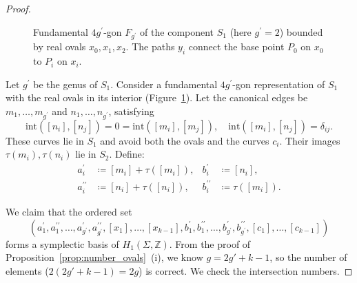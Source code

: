\documentclass[11pt,a4paper]{article}
\theoremstyle{definition}
\newcommand{\Z}{\mathds{Z}}
\begin{document}
\begin{proof}
\begin{figure}[htbp]
	\caption{Fundamental $4g^{\prime}$-gon $F_{g^{\prime}}$ of the component $S_1$ (here $g^{\prime}=2$) bounded by real ovals $x_0, x_1, x_2$. The paths $y_i$ connect the base point $P_0$ on $x_0$ to $P_i$ on $x_i$.}
	\label{fig:fundamental}
\end{figure}
	
	Let $g^{\prime}$ be the genus of $S_1$. Consider a fundamental $4g^{\prime}$-gon representation of $S_1$ with the real ovals in its interior (Figure~\ref{fig:fundamental}). Let the canonical edges be $m_1, \dots, m_{g^{\prime}}$ and $n_1, \dots, n_{g^{\prime}}$, satisfying
	\[
	\mathrm{int}([n_i], [n_j]) = 0 = \mathrm{int}([m_i], [m_j]), \quad
	\mathrm{int}([m_i], [n_j]) = \delta_{ij}.
	\]
	These curves lie in $S_1$ and avoid both the ovals and the curves $c_i$. Their images $\tau(m_i), \tau(n_i)$ lie in $S_2$. Define:
	\begin{align*}
		a^{\prime}_i &\coloneq [m_i] + \tau([m_i]), & b^{\prime}_i &\coloneq [n_i],\\
		a^{\prime \prime}_i &\coloneq [n_i] + \tau([n_i]), & b^{\prime \prime}_i &\coloneq \tau([m_i]).
	\end{align*}
	
	We claim that the ordered set
	\[
	\left( a^{\prime}_1, a^{\prime \prime}_1, \ldots, a^{\prime}_{g^{\prime}}, a^{\prime \prime}_{g^{\prime}}, [x_1], \dots, [x_{k-1}], b^{\prime}_1, b^{\prime \prime}_1, \ldots, b^{\prime}_{g^{\prime}}, b^{\prime \prime}_{g^{\prime}}, [c_1], \dots, [c_{k-1}] \right)
	\]
	forms a symplectic basis of $H_1(\Sigma, \Z)$. From the proof of Proposition~\ref{prop:number_ovals}~(i), we know $g = 2g' + k - 1$, so the number of elements ($2(2g' + k - 1) = 2g$) is correct. We check the intersection numbers.
	

\end{proof}
\end{document}
